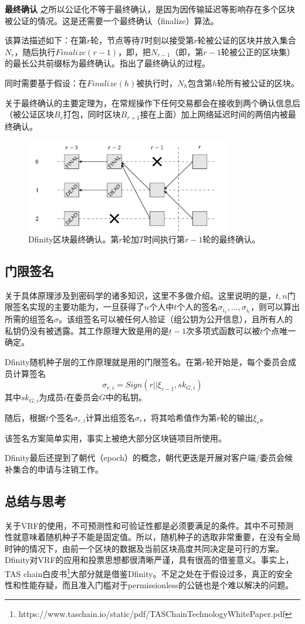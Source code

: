 \textbf{最终确认}
之所以公证化不等于最终确认，是因为因传输延迟等影响存在多个区块被公证的情况。这是还需要一个最终确认（finalize）算法。

该算法描述如下：在第$r$轮，节点等待$T$时刻以接受第$r$轮被公证的区块并放入集合$N_{r}$，随后执行$Finalize(r-1)$，即，把$N_{r-1}$（即，第$r-1$轮被公正的区块集）的最长公共前缀标为最终确认。指出了最终确认的过程。

同时需要基于假设：在$Finalize(h)$被执行时，$N_h$包含第$h$轮所有被公证的区块。

关于最终确认的主要定理为，在常规操作下任何交易都会在接收到两个确认信息后（被公证区块$B_r$打包，同时区块$B_{r+1}$接在上面）加上网络延迟时间的两倍内被最终确认。

\begin{figure}
	\centering
	\includegraphics[width=0.8\textwidth]{../common/Dfinity_2.png}
	\caption{Dfinity区块最终确认。第$r$轮加$T$时间执行第$r-1$轮的最终确认。} 		
	\label{fig:Dfinity2}
\end{figure}

\subsection{门限签名}
关于具体原理涉及到密码学的诸多知识，这里不多做介绍。这里说明的是，$t,n$门限签名实现的主要功能为，一旦获得了$n$个人中$t$个人的签名$\sigma_{i_1},...,\sigma_{i_t}$，则可以算出所需的组签名$\sigma$。该组签名可以被任何人验证（组公钥为公开信息），且所有人的私钥仍没有被透露。其工作原理大致是用的是$t-1$次多项式函数可以被$t$个点唯一确定。

Dfinity随机种子层的工作原理就是用的门限签名。在第$r$轮开始是，每个委员会成员计算签名
$$\sigma_{r,i}=Sign(r||\xi_{r-1},sk_{G,i})$$
其中$sk_{G,i}$为成员$i$在委员会$G$中的私钥。

随后，根据$t$个签名$\sigma_{r,i}$计算出组签名$\sigma_r$，将其哈希值作为第$r$轮的输出$\xi_r$。

该签名方案简单实用，事实上被绝大部分区块链项目所使用。

Dfinity最后还提到了朝代（epoch）的概念，朝代更迭是开展对客户端/委员会候补集合的申请与注销工作。
\subsection{总结与思考}
关于VRF的使用，不可预测性和可验证性都是必须要满足的条件。其中不可预测性就意味着随机种子不能是固定值。所以，随机种子的选取非常重要，在没有全局时钟的情况下，由前一个区块的数据及当前区块高度共同决定是可行的方案。Dfinity对VRF的应用和投票思想都很清晰严谨，具有很高的借鉴意义。事实上，TAS chain白皮书\footnote{https://www.taschain.io/static/pdf/TASChainTechnologyWhitePaper.pdf}大部分就是借鉴Dfinity。不足之处在于假设过多，真正的安全性和性能存疑，而且准入门槛对于permissionless的公链也是个难以解决的问题。
